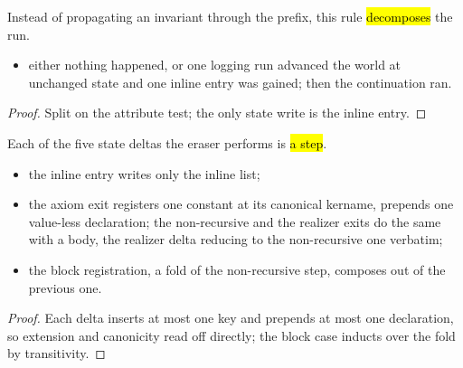 \begin{lemma}
\label{lem:Erasure-run_inline_prefix_decomp-prime}
\leanok
{}
 Instead of propagating an invariant through the prefix, this rule \hl{decomposes} the
run.
\begin{itemize}
\item {} either nothing happened, or one logging run advanced the world at unchanged state
and one inline entry was gained; then the continuation ran.
\end{itemize}
\end{lemma}
\begin{proof}
\leanok
{}
 Split on the attribute test; the only state write is the inline entry.
\end{proof}

\begin{lemma}
\label{lem:Erasure-runConcl_nonrecConstState}
\leanok
{}
 Each of the five state deltas the eraser performs is \hl{a  step}.
\begin{itemize}
\item the inline entry writes only the inline list;
\item the axiom exit registers one constant at its canonical kername, prepends one value-less
declaration; the non-recursive and the realizer exits do the same with a body, the realizer delta
reducing to the non-recursive one verbatim;
\item the block registration, a fold of the non-recursive step, composes out of the previous one.
\end{itemize}
\end{lemma}
\begin{proof}
\leanok
{}
 Each delta inserts at most one key and prepends at most one declaration, so extension
and canonicity read off directly; the block case inducts over the fold by transitivity.
\end{proof}


